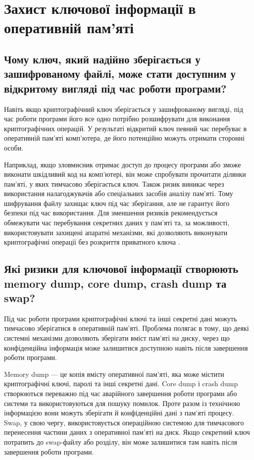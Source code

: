 \section{Захист ключової інформації в оперативній пам’яті}

\subsection{Чому ключ, який надійно зберігається у зашифрованому файлі, може стати доступним у відкритому вигляді під час роботи програми?}

Навіть якщо криптографічний ключ зберігається у зашифрованому вигляді, під час роботи програми його все одно 
потрібно розшифрувати для виконання криптографічних операцій. У результаті відкритий ключ певний час перебуває 
в оперативній пам'яті комп'ютера, де його потенційно можуть отримати сторонні особи.

Наприклад, якщо зловмисник отримає доступ до процесу програми або зможе виконати шкідливий код на комп'ютері, 
він може спробувати прочитати ділянки пам'яті, у яких тимчасово зберігається ключ. Також ризик виникає через 
використання налагоджувачів або спеціальних засобів аналізу пам'яті. Тому шифрування файлу захищає ключ під час зберігання, 
але не гарантує його безпеки під час використання. Для зменшення ризиків рекомендується обмежувати час перебування 
секретних даних у пам'яті та, за можливості, використовувати захищені апаратні механізми, які дозволяють виконувати 
криптографічні операції без розкриття приватного ключа \cite{owaspkey,nistmemory}.

\subsection{Які ризики для ключової інформації створюють memory dump, core dump, crash dump та swap?}

Під час роботи програми криптографічні ключі та інші секретні дані можуть тимчасово зберігатися в оперативній пам'яті. 
Проблема полягає в тому, що деякі системні механізми дозволяють зберігати вміст пам'яті на диску, 
через що конфіденційна інформація може залишитися доступною навіть після завершення роботи програми.

Memory dump — це копія вмісту оперативної пам'яті, яка може містити криптографічні ключі, паролі та інші секретні дані. 
Core dump і crash dump створюються переважно під час аварійного завершення роботи програми або системи та використовуються 
для пошуку помилок. Проте разом із технічною інформацією вони можуть зберігати й конфіденційні дані з пам'яті процесу. 
Swap, у свою чергу, використовується операційною системою для тимчасового перенесення частини даних з оперативної пам'яті на диск. 
Якщо секретний ключ потрапить до swap-файлу або розділу, він може залишитися там навіть після завершення роботи програми.

